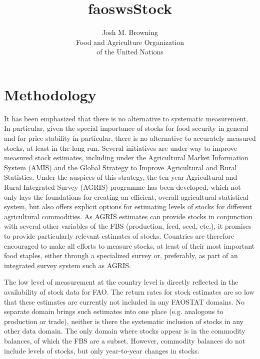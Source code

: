\documentclass[nojss]{jss}\usepackage[]{graphicx}\usepackage[]{color}
\title{\bf faoswsStock}
\author{Josh M. Browning\\ Food and Agriculture
    Organization \\ of the United Nations\\}
\makeatletter
\newenvironment{kframe}{%
 \def\at@end@of@kframe{}%
 \ifinner\ifhmode%
  \def\at@end@of@kframe{\end{minipage}}%
  \begin{minipage}{\columnwidth}%
 \fi\fi%
 \def\FrameCommand##1{\hskip\@totalleftmargin \hskip-\fboxsep
 \colorbox{shadecolor}{##1}\hskip-\fboxsep
     \hskip-\linewidth \hskip-\@totalleftmargin \hskip\columnwidth}%
 \MakeFramed {\advance\hsize-\width
   \@totalleftmargin\z@ \linewidth\hsize
   \@setminipage}}%
 {\par\unskip\endMakeFramed%
 \at@end@of@kframe}
\newenvironment{knitrout}{}{} %
\makeatother
\begin{document}

\begin{knitrout}
\color{fgcolor}\begin{kframe}


{\ttfamily\noindent\bfseries\color{errorcolor}{\#\# Error in function (type, msg, asError = TRUE) : unable to use client certificate (no key found or wrong pass phrase?)}}

{\ttfamily\noindent\bfseries\color{errorcolor}{\#\# Error in faoswsStock:::getStockData(): No directory set up for this user yet!}}\end{kframe}
\end{knitrout}
\newpage
\section{Methodology}

It has been emphasized that there is no alternative to systematic measurement. In particular, given the special importance of stocks for food security in general and for price stability in particular, there is no alternative to accurately measured stocks, at least in the long run. Several initiatives are under way to improve measured stock estimates, including under the Agricultural Market Information System (AMIS) and the Global Strategy to Improve Agricultural and Rural Statistics. Under the auspices of this strategy, the ten-year Agricultural and Rural Integrated Survey (AGRIS) programme has been developed, which not only lays the foundations for creating an efficient, overall agricultural statistical system, but also offers explicit options for estimating levels of stocks for different agricultural commodities. As AGRIS estimates can provide stocks in conjunction with several other variables of the FBS (production, feed, seed, etc.), it promises to provide particularly relevant estimates of stocks. Countries are therefore encouraged to make all efforts to measure stocks, at least of their most important food staples, either through a specialized survey or, preferably, as part of an integrated survey system such as AGRIS.

The low level of measurement at the country level is directly reflected in the availability of stock data for FAO. The return rates for stock estimates are so low that these estimates are currently not included in any FAOSTAT domains. No separate domain brings such estimates into one place (e.g. analogous to production or trade), neither is there the systematic inclusion of stocks in any other data domain. The only domain where stocks appear is in the commodity balances, of which the FBS are a subset. However, commodity balances do not include levels of stocks, but only year-to-year changes in stocks. 
\end{document}
